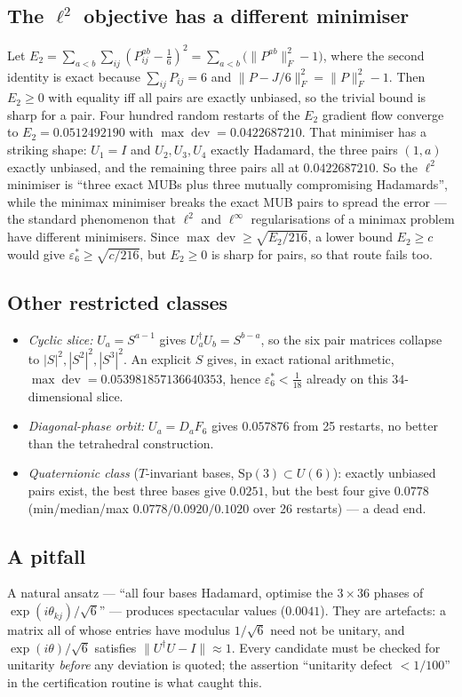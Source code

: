 \documentclass[11pt,a4paper]{article}
\theoremstyle{remark}
\newcommand{\dev}{\operatorname{dev}}
\newcommand{\eps}{\varepsilon}
\begin{document}
\subsection{The $\ell^2$ objective has a different minimiser}
Let $E_2=\sum_{a<b}\sum_{ij}(P^{ab}_{ij}-\tfrac16)^2=\sum_{a<b}\bigl(\|P^{ab}\|_F^2-1\bigr)$,
where the second identity is exact because $\sum_{ij}P_{ij}=6$ and
$\|P-J/6\|_F^2=\|P\|_F^2-1$.  Then $E_2\ge0$ with equality iff all pairs are exactly
unbiased, so the trivial bound is sharp for a pair.  Four hundred random restarts of the
$E_2$ gradient flow converge to $E_2=0.0512492190$ with
$\max\dev=0.0422687210$.  That minimiser has a striking shape: $U_1=I$ and $U_2,U_3,U_4$
exactly Hadamard, the three pairs $(1,a)$ exactly unbiased, and the remaining three pairs all
at $0.0422687210$.  So the $\ell^2$ minimiser is ``three exact MUBs plus three mutually
compromising Hadamards'', while the minimax minimiser breaks the exact MUB pairs to spread the
error --- the standard phenomenon that $\ell^2$ and $\ell^\infty$ regularisations of a minimax
problem have different minimisers.  Since $\max\dev\ge\sqrt{E_2/216}$, a lower bound
$E_2\ge c$ would give $\eps_6^*\ge\sqrt{c/216}$, but $E_2\ge0$ is sharp for pairs, so that
route fails too.

\subsection{Other restricted classes}
\begin{itemize}
\item \emph{Cyclic slice:} $U_a=S^{a-1}$ gives $U_a^\dagger U_b=S^{b-a}$, so the six pair
matrices collapse to $|S|^2,|S^2|^2,|S^3|^2$.  An explicit $S$ gives, in exact rational
arithmetic, $\max\dev=0.053981857136640353$, hence $\eps_6^*<\tfrac1{18}$ already on this
$34$-dimensional slice.
\item \emph{Diagonal-phase orbit:} $U_a=D_aF_6$ gives $0.057876$ from 25 restarts, no better
than the tetrahedral construction.
\item \emph{Quaternionic class} ($T$-invariant bases, $\mathrm{Sp}(3)\subset U(6)$): exactly
unbiased pairs exist, the best three bases give $0.0251$, but the best four give $0.0778$
(min/median/max $0.0778/0.0920/0.1020$ over 26 restarts) --- a dead end.
\end{itemize}

\subsection{A pitfall}
A natural ansatz --- ``all four bases Hadamard, optimise the $3\times36$ phases of
$\exp(i\theta_{kj})/\sqrt6$'' --- produces spectacular values ($0.0041$).  They are artefacts:
a matrix all of whose entries have modulus $1/\sqrt6$ need not be unitary, and
$\exp(i\theta)/\sqrt6$ satisfies $\|U^\dagger U-I\|\approx1$.  Every candidate must be checked
for unitarity \emph{before} any deviation is quoted; the assertion ``unitarity defect
$<1/100$'' in the certification routine is what caught this.
\end{document}
